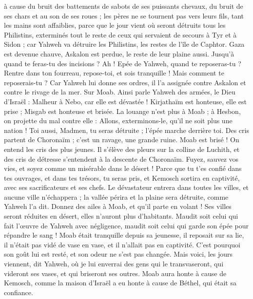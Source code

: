 \begin{multicols}{2}
à cause du bruit des battements de sabots de ses puissants chevaux, du bruit de ses chars et au son de ses roues ; les pères ne se tournent pas vers leurs fils, tant les mains sont affaiblies,
parce que le jour vient où seront détruits tous les Philistins, exterminés tout le reste de ceux qui servaient de secours à Tyr et à Sidon ; car Yahweh va détruire les Philistins, les restes de l'île de Caphtor.
Gaza est devenue chauve, Askalon est perdue, le reste de leur plaine aussi. Jusqu'à quand te feras-tu des incisions ?
Ah ! Epée de Yahweh, quand te reposeras-tu ? Rentre dans ton fourreau, repose-toi, et sois tranquille !
Mais comment te reposerais-tu ? Car Yahweh lui donne ses ordres, il l'a assignée contre Askalon et contre le rivage de la mer.
\VerseOne{}Sur Moab. Ainsi parle Yahweh des armées, le Dieu d'Israël : Malheur à Nebo, car elle est dévastée ! Kirjathaïm est honteuse, elle est prise ; Misgab est honteuse et brisée.
La louange n'est plus à Moab ; à Hesbon, on projette du mal contre elle : Allons, exterminons-le, qu'il ne soit plus une nation ! Toi aussi, Madmen, tu seras détruite ; l'épée marche derrière toi.
Des cris partent de Choronaïm ; c'est un ravage, une grande ruine.
Moab est brisé ! On entend les cris des plus jeunes.
Il s'élève des pleurs sur la colline de Luchith, et des cris de détresse s'entendent à la descente de Choronaïm.
Fuyez, sauvez vos vies, et soyez comme un misérable dans le désert !
Parce que tu t'es confié dans tes ouvrages, et dans tes trésors, tu seras pris, et Kemosch sortira en captivité, avec ses sacrificateurs et ses chefs.
Le dévastateur entrera dans toutes les villes, et aucune ville n'échappera ; la vallée périra et la plaine sera détruite, comme Yahweh l'a dit.
Donnez des ailes à Moab, et qu'il parte en volant ! Ses villes seront réduites en désert, elles n'auront plus d'habitants.
Maudit soit celui qui fait l'œuvre de Yahweh avec négligence, maudit soit celui qui garde son épée pour répandre le sang !
Moab était tranquille depuis sa jeunesse, il reposait sur sa lie, il n'était pas vidé de vase en vase, et il n'allait pas en captivité. C'est pourquoi son goût lui est resté, et son odeur ne s'est pas changée.
Mais voici, les jours viennent, dit Yahweh, où je lui enverrai des gens qui le transvaseront, qui videront ses vases, et qui briseront ses outres.
Moab aura honte à cause de Kemosch, comme la maison d'Israël a eu honte à cause de Béthel, qui était sa confiance.

\end{multicols}
